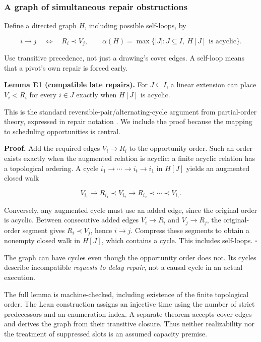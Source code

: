 \subsubsection{A graph of simultaneous repair
obstructions}\label{a-graph-of-simultaneous-repair-obstructions}

Define a directed graph \(H\), including possible self-loops, by

\[
i\longrightarrow j \quad\Longleftrightarrow\quad R_i\prec V_j,
\qquad
\alpha(H)=\max\{|J|:J\subseteq I,\ H[J]\text{ is acyclic}\}.
\]

Use transitive precedence, not just a drawing's cover edges. A self-loop
means that a pivot's own repair is forced early.

\textbf{Lemma E1 (compatible late repairs).} For \(J\subseteq I\), a
linear extension can place \(V_i<R_i\) for every \(i\in J\) exactly when
\(H[J]\) is acyclic.

This is the standard reversible-pair/alternating-cycle argument from
partial-order theory, expressed in repair notation
\cite{streib2014dimension}. We include the proof because the mapping to
scheduling opportunities is central.

\textbf{Proof.} Add the required edges \(V_i\to R_i\) to the opportunity
order. Such an order exists exactly when the augmented relation is
acyclic: a finite acyclic relation has a topological ordering. A cycle
\(i_1\to\cdots\to i_t\to i_1\) in \(H[J]\) yields an augmented closed
walk

\[
V_{i_1}\to R_{i_1}\prec V_{i_2}\to R_{i_2}\prec\cdots\prec V_{i_1}.
\]

Conversely, any augmented cycle must use an added edge, since the
original order is acyclic. Between consecutive added edges
\(V_i\to R_i\) and \(V_j\to R_j\), the original-order segment gives
\(R_i\prec V_j\), hence \(i\to j\). Compress these segments to obtain a
nonempty closed walk in \(H[J]\), which contains a cycle. This includes
self-loops. \(\square\)

The graph can have cycles even though the opportunity order does not.
Its cycles describe incompatible \emph{requests to delay repair}, not a
causal cycle in an actual execution.

The full lemma is machine-checked, including existence of the finite
topological order. The Lean construction assigns an injective time using
the number of strict predecessors and an enumeration index. A separate
theorem accepts cover edges and derives the graph from their transitive
closure. Thus neither realizability nor the treatment of suppressed
slots is an assumed capacity premise.

